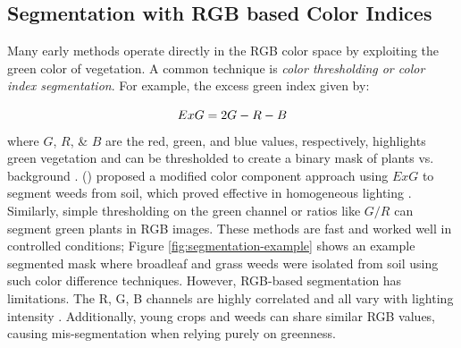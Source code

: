 \documentclass[letterpaper]{report}
\begin{document}
\subsection{Segmentation with RGB based Color Indices}  
Many early methods operate directly in the RGB color space by exploiting the green color of vegetation. A common technique is \textit{color thresholding or color index segmentation}. For example, the excess green index given by:

\begin{equation}\label{eqn:exg}
ExG = 2G - R - B \\
\end{equation}
 where $G$, $R$, \& $B$ are the red, green, and blue values, respectively, highlights green vegetation and can be thresholded to create a binary mask of plants vs. background \parencite{Wu2021-gt}. \citeauthor{Tang2000-an} (\citeyear{Tang2000-an}) proposed a modified color component approach using $ExG$ to segment weeds from soil, which proved effective in homogeneous lighting \parencite{Tang2000-an}. Similarly, simple thresholding on the green channel or ratios like $G/R$ can segment green plants in RGB images. These methods are fast and worked well in controlled conditions; Figure \ref{fig:segmentation-example} shows an example segmented mask where broadleaf and grass weeds were isolated from soil using such color difference techniques. However, RGB-based segmentation has limitations. The R, G, B channels are highly correlated and all vary with lighting intensity \parencite{Wu2021-gt}. Additionally, young crops and weeds can share similar RGB values, causing mis-segmentation when relying purely on greenness.
\end{document}
